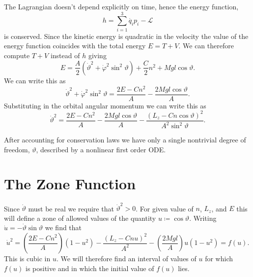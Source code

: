 \documentclass[fleqn]{NotesClass}
\newcommand*{\lagrangian}{\mathcal{L}}
\begin{document}
    The Lagrangian doesn't depend explicitly on time, hence the energy function,
    \begin{equation}
        h = \sum_{i=1}^{3}\dot{q_i}p_i - \lagrangian
    \end{equation}
    is conserved.
    Since the kinetic energy is quadratic in the velocity the value of the energy function coincides with the total energy \(E = T + V\).
    We can therefore compute \(T + V\) instead of \(h\) giving
    \begin{equation}
        E = \frac{A}{2}(\dot{\vartheta}^2 + \dot{\varphi}^2\sin^2\vartheta) + \frac{C}{2}n^2 + Mgl\cos\vartheta.
    \end{equation}
    We can write this as
    \begin{equation}
        \dot{\vartheta}^2 + \dot{\varphi}^2\sin^2\vartheta = \frac{2E - Cn^2}{A} - \frac{2Mgl\cos\vartheta}{A}.
    \end{equation}
    Substituting in the orbital angular momentum we can write this as
    \begin{equation}
        \dot{\vartheta}^2 = \frac{2E - Cn^2}{A} - \frac{2Mgl\cos\vartheta}{A} - \frac{(L_z - Cn\cos\vartheta)^2}{A^2\sin^2\vartheta}.
    \end{equation}
    
    After accounting for conservation laws we have only a single nontrivial degree of freedom, \(\vartheta\), described by a nonlinear first order ODE.
    
    \section{The Zone Function}
    Since \(\dot{\vartheta}\) must be real we require that \(\dot{\vartheta}^2 > 0\).
    For given value of \(n\), \(L_z\), and \(E\) this will define a zone of allowed values of the quantity \(u \coloneqq \cos\vartheta\).
    Writing \(\dot{u} = -\dot{\vartheta}\sin\vartheta\) we find that
    \begin{equation}
        \dot{u}^2 = \left( \frac{2E - Cn^2}{A} \right)(1 - u^2) - \frac{(L_z - Cnu)^2}{A^2} - \left( \frac{2Mgl}{A} \right) u(1 - u^2) = f(u).
    \end{equation}
    This is cubic in \(u\).
    We will therefore find an interval of values of \(u\) for which \(f(u)\) is positive and in which the initial value of \(f(u)\) lies.
    
\end{document}
